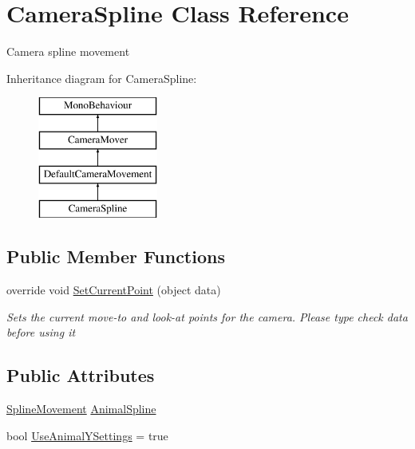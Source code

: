 \hypertarget{class_camera_spline}{}\section{Camera\+Spline Class Reference}
\label{class_camera_spline}


Camera spline movement  


Inheritance diagram for Camera\+Spline\+:\begin{figure}[H]
\begin{center}
\leavevmode
\includegraphics[height=4.000000cm]{class_camera_spline}
\end{center}
\end{figure}
\subsection*{Public Member Functions}
\begin{DoxyCompactItemize}
\item 
override void \mbox{\hyperlink{class_camera_spline_a8ff1f479307c63e3ecc75d089ff1bfcf}{Set\+Current\+Point}} (object data)
\begin{DoxyCompactList}\small\item\em Sets the current move-\/to and look-\/at points for the camera. Please type check {\itshape data}  before using it \end{DoxyCompactList}\end{DoxyCompactItemize}
\subsection*{Public Attributes}
\begin{DoxyCompactItemize}
\item 
\mbox{\hyperlink{class_spline_movement}{Spline\+Movement}} \mbox{\hyperlink{class_camera_spline_ac7054bc6215716c3808cfe21326639a7}{Animal\+Spline}}
\item 
bool \mbox{\hyperlink{class_camera_spline_a2d886ed83b154eba17d8d3f7900af697}{Use\+Animal\+Y\+Settings}} = true
\end{DoxyCompactItemize}
